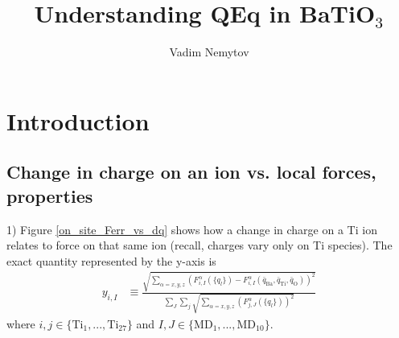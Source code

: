 \documentclass[11pt, a4paper]{report}
\begin{document}
\title{\textbf{Understanding QEq in BaTiO$_3$}}
\author{Vadim Nemytov}

\maketitle


\tableofcontents
\chapter*{Introduction}
\section{Change in charge on an ion vs. local forces, properties}


1) Figure \ref{on_site_Ferr_vs_dq} shows how a change in charge on a Ti ion relates to force on that same ion (recall, charges vary only on Ti species). The exact quantity represented by the y-axis is
\begin{align*}
y_{i,I} &\equiv  \frac{\sqrt{\sum_{\alpha = x,y,z}\left(F_{i,I}^{\alpha}(\{q_l\})-F_{i,I}^{\alpha}(\bar{q}_{\text{Ba}},\bar{q}_{\text{Ti}},\bar{q}_{\text{O}})\right)^2}}{\sum_{J}\sum_{j}\sqrt{\sum_{\alpha = x,y,z}\left(F_{j,J}^{\alpha}(\{q_l\})\right)^2}}
\end{align*}
where $i,j\in \{\text{Ti}_1,...,\text{Ti}_{27}\}$ and $I,J\in\{\text{MD}_1,...,\text{MD}_{10}\}$. 
\end{document}
